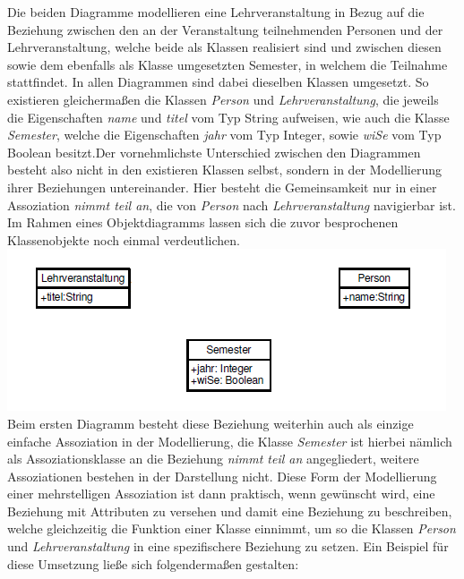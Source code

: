 \documentclass{swp1}
\begin{document}
Die beiden Diagramme modellieren eine Lehrveranstaltung in Bezug auf die Beziehung zwischen den an der Veranstaltung teilnehmenden Personen und der Lehrveranstaltung, welche beide als Klassen realisiert sind und zwischen diesen sowie dem ebenfalls als Klasse umgesetzten Semester, in welchem die Teilnahme stattfindet. In allen Diagrammen sind dabei dieselben Klassen umgesetzt. So existieren gleichermaßen die Klassen \emph{Person} und \emph{Lehrveranstaltung}, die jeweils die Eigenschaften \emph{name} und \emph{titel} vom Typ String aufweisen, wie auch die Klasse \emph{Semester}, welche die Eigenschaften \emph{jahr} vom Typ Integer, sowie \emph{wiSe} vom Typ Boolean besitzt.Der vornehmlichste Unterschied zwischen den Diagrammen besteht also nicht in den existieren Klassen selbst, sondern in der Modellierung ihrer Beziehungen untereinander. Hier besteht die Gemeinsamkeit nur in einer Assoziation \emph{nimmt teil an}, die von \emph{Person} nach \emph{Lehrveranstaltung} navigierbar ist.\newline
\newline
Im Rahmen eines Objektdiagramms lassen sich die zuvor besprochenen Klassenobjekte noch einmal verdeutlichen.\newline
\newline
\includegraphics{Objektdiagramm}
\newline
Beim ersten Diagramm besteht diese Beziehung weiterhin auch als einzige einfache Assoziation in der Modellierung, die Klasse \emph{Semester} ist hierbei nämlich als Assoziationsklasse an die Beziehung \emph{nimmt teil an} angegliedert, weitere Assoziationen bestehen in der Darstellung nicht. Diese Form der Modellierung einer mehrstelligen Assoziation ist dann praktisch, wenn gewünscht wird, eine Beziehung mit Attributen zu versehen und damit eine Beziehung zu beschreiben, welche gleichzeitig die Funktion einer Klasse einnimmt, um so die Klassen \emph{Person} und \emph{Lehrveranstaltung} in eine spezifischere Beziehung zu setzen.\newline
Ein Beispiel für diese Umsetzung ließe sich folgendermaßen gestalten:
\end{document}
